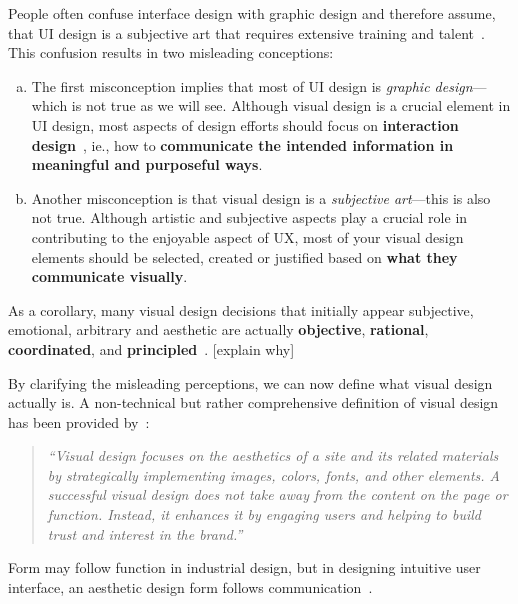 People often confuse interface design with graphic design and therefore assume, that UI design is a subjective art that requires extensive training and talent~\citep{mckay:2013}.
This confusion results in two misleading conceptions:

\begin{enumerate}[a)]
	\item The first misconception implies that most of UI design is \emph{graphic design}---which is not true as we will see. 
Although visual design is a crucial element in UI design, most aspects of design efforts should focus on \textbf{interaction design}~\citep{mckay:2013}, ie., how to \textbf{communicate the intended information in meaningful and purposeful ways}.

	\item Another misconception is that visual design is a \emph{subjective art}---this is also not true. 
Although artistic and subjective aspects play a crucial role in contributing to the enjoyable aspect of UX, most of your visual design elements should be selected, created or justified based on \textbf{what they communicate visually}.
\end{enumerate}


As a corollary, many visual design decisions that initially appear subjective, emotional, arbitrary and aesthetic are actually \textbf{objective}, \textbf{rational}, \textbf{coordinated}, and \textbf{principled}~\citep{mckay:2013}. [explain why]

By clarifying the misleading perceptions, we can now define what visual design actually is.
A non-technical but rather comprehensive definition of visual design has been provided by~\citep{usability_gov:2018a}:

\begin{quote}
\emph{``Visual design focuses on the aesthetics of a site and its related materials by strategically implementing images, colors, fonts, and other elements. A successful visual design does not take away from the content on the page or function.  Instead, it enhances it by engaging users and helping to build trust and interest in the brand.''}~\citep{usability_gov:2018a}
\end{quote}

Form may follow function in industrial design, but in designing intuitive user interface, an aesthetic design form follows communication~\citep{mckay:2013}.

